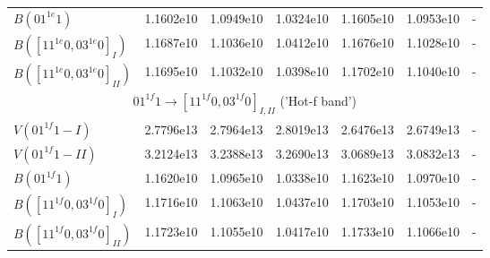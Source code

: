 \documentclass{report}
\begin{document}
\begin{appendices}
\begin{sidewaystable}
\begin{tabular}{|l|cccccc|}
$B(01^{1e}1)$                 & 1.1602e10 & 1.0949e10 & 1.0324e10 & 1.1605e10 & 1.0953e10 & -\\
$B([11^{1e}0,03^{1e}0]_I)$    & 1.1687e10 & 1.1036e10 & 1.0412e10 & 1.1676e10 & 1.1028e10 & -\\
$B([11^{1e}0,03^{1e}0]_{II})$ & 1.1695e10 & 1.1032e10 & 1.0398e10 & 1.1702e10 & 1.1040e10 & -\\
\hline
\multicolumn{7}{|c|}{$01^{1f}1\rightarrow[11^{1f}0,03^{1f}0]_{I,II}$ ('Hot-f band')}\\
\hline
$V(01^{1f}1-I)$               & 2.7796e13 & 2.7964e13 & 2.8019e13 & 2.6476e13 & 2.6749e13 & -\\
$V(01^{1f}1-II)$              & 3.2124e13 & 3.2388e13 & 3.2690e13 & 3.0689e13 & 3.0832e13 & -\\
$B(01^{1f}1)$                 & 1.1620e10 & 1.0965e10 & 1.0338e10 & 1.1623e10 & 1.0970e10 & -\\
$B([11^{1f}0,03^{1f}0]_I)$    & 1.1716e10 & 1.1063e10 & 1.0437e10 & 1.1703e10 & 1.1053e10 & -\\
$B([11^{1f}0,03^{1f}0]_{II})$ & 1.1723e10 & 1.1055e10 & 1.0417e10 & 1.1733e10 & 1.1066e10 & -\\
\hline
\end{tabular}
\end{sidewaystable}


\end{appendices}
\end{document}
